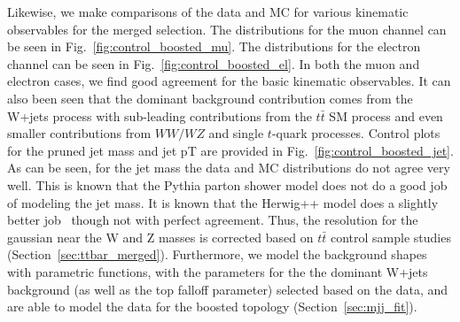 Likewise, we make comparisons of the data and MC for various kinematic observables for the merged selection. 
The distributions for the muon channel can be seen in Fig.~\ref{fig:control_boosted_mu}.
The distributions for the electron channel can be seen in Fig.~\ref{fig:control_boosted_el}.
In both the muon and electron cases, we find good agreement for the basic kinematic observables. It can also been seen that the dominant background contribution comes from the W+jets process with sub-leading contributions from 
the $t\bar{t}$ SM process and even smaller contributions from $WW/WZ$ and single $t$-quark processes. Control plots for the pruned jet mass and jet pT are provided in Fig.~\ref{fig:control_boosted_jet}. As can be seen, for the jet mass the data and MC distributions do not agree very well. This is known that the Pythia parton shower model does not do a good job of modeling the jet mass.  
It is known that the Herwig++ model does a slightly better job~\cite{SMPJS} though not with perfect agreement.  Thus, the resolution for the gaussian near the W and Z masses is corrected based on $t\bar{t}$ control sample studies (Section~\ref{sec:ttbar_merged}). Furthermore, we model the background shapes with parametric functions, with the parameters for the the dominant W+jets background (as well as the top falloff parameter) selected based on the data, and are able to model the data for the boosted topology (Section~\ref{sec:mjj_fit}).




